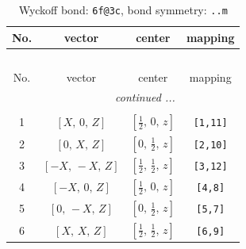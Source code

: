 \documentclass[fleqn,8pt]{jsarticle}
\begin{document}
\begin{longtable}{cccc}
\caption{Wyckoff bond: {\tt 6f@3c}, bond symmetry: {\tt ..m}}
 \\
 \hline \hline
No. & vector & center & mapping \\ \hline \endfirsthead

\multicolumn{3}{l}{\tablename\ \thetable{}} \\
 \hline \hline
No. & vector & center & mapping \\ \hline \endhead

 \hline \hline
\multicolumn{3}{r}{\footnotesize\it continued ...} \\ \endfoot

 \hline \hline
\multicolumn{3}{r}{} \\ \endlastfoot

1 & $\left[ X,\, 0,\, Z \right]$ & $\left[ \frac{1}{2},\, 0,\, z \right]$ & {\tt [1,11]} \\ \hline
2 & $\left[ 0,\, X,\, Z \right]$ & $\left[ 0,\, \frac{1}{2},\, z \right]$ & {\tt [2,10]} \\ \hline
3 & $\left[ - X,\, - X,\, Z \right]$ & $\left[ \frac{1}{2},\, \frac{1}{2},\, z \right]$ & {\tt [3,12]} \\ \hline
4 & $\left[ - X,\, 0,\, Z \right]$ & $\left[ \frac{1}{2},\, 0,\, z \right]$ & {\tt [4,8]} \\ \hline
5 & $\left[ 0,\, - X,\, Z \right]$ & $\left[ 0,\, \frac{1}{2},\, z \right]$ & {\tt [5,7]} \\ \hline
6 & $\left[ X,\, X,\, Z \right]$ & $\left[ \frac{1}{2},\, \frac{1}{2},\, z \right]$ & {\tt [6,9]} \\
\end{longtable}
\renewcommand{\arraystretch}{1.2}
\end{document}
